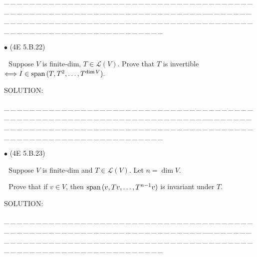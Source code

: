 \documentclass[a4paper, 11pt, UTF8]{article}
\def\Spn{\textup{span}\,}
\def\Lm{\mathcal{L}}
\begin{document}
\begin{large}
\par
{\tiny \_\,\_\,\_\,\_\,\_\,\_\,\_\,\_\,\_\,\_\,\_\,\_\,\_\,\_\,\_\,\_\,\_\,\_\,\_\,\_\,\_\,\_\,\_\,\_\,\_\,\_\,\_\,\_\,\_\,\_\,\_\,\_\,\_\,\_\,\_\,\_\,\_\,\_\,\_\,\_\,\_\,\_\,\_\,\_\,\_\,\_\,\_\,\_\,\_\,\_\,\_\,\_\,\_\,\_\,\_\,\_\,\_\,\_\,\_\,\_\,\_\,\_\,\_\,\_\,\_\,\_\,\_\,\_\,\_\,\_\,\_\_\,\_\,\_\,\_\,\_\,\_\,\_\,\_\,\_\,\_\,\_\,\_\,\_\,\_\,\_\,\_\,\_\,\_\,\_\,\_\,\_\,\_\,\_\,\_\,\_\,\_\,\_\,\_\,\_\,\_\,\_\,\_\,\_\,\_\,\_\,\_\,\_\,\_\,\_\,\_\,\_\,\_\,\_\,\_\,\_\,\_\,\_\,\_\,\_\,\_\,\_\,\_\,\_\,\_\,\_\,\_\,\_\,\_\,\_\,\_\,\_\,\_\,\_\,\_\,\_\,\_\,\_\,\_\,\_\,\_\,\_}\par

{\small $\bullet$} (\normalsize{4E 5.B.22})\par\,\, {\timessl\Large 
Suppose $V$ is finite-dim, $T\in \Lm(V)$. Prove that $T$ is invertible $\Longleftrightarrow I\in\Spn(T, T^2, \dots , T^{\dim V}).$
}\par
{\timesbf S\footnotesize{OLUTION:}}\par\quad

\par
{\tiny \_\,\_\,\_\,\_\,\_\,\_\,\_\,\_\,\_\,\_\,\_\,\_\,\_\,\_\,\_\,\_\,\_\,\_\,\_\,\_\,\_\,\_\,\_\,\_\,\_\,\_\,\_\,\_\,\_\,\_\,\_\,\_\,\_\,\_\,\_\,\_\,\_\,\_\,\_\,\_\,\_\,\_\,\_\,\_\,\_\,\_\,\_\,\_\,\_\,\_\,\_\,\_\,\_\,\_\,\_\,\_\,\_\,\_\,\_\,\_\,\_\,\_\,\_\,\_\,\_\,\_\,\_\,\_\,\_\,\_\,\_\_\,\_\,\_\,\_\,\_\,\_\,\_\,\_\,\_\,\_\,\_\,\_\,\_\,\_\,\_\,\_\,\_\,\_\,\_\,\_\,\_\,\_\,\_\,\_\,\_\,\_\,\_\,\_\,\_\,\_\,\_\,\_\,\_\,\_\,\_\,\_\,\_\,\_\,\_\,\_\,\_\,\_\,\_\,\_\,\_\,\_\,\_\,\_\,\_\,\_\,\_\,\_\,\_\,\_\,\_\,\_\,\_\,\_\,\_\,\_\,\_\,\_\,\_\,\_\,\_\,\_\,\_\,\_\,\_\,\_\,\_}\par

{\small $\bullet$} (\normalsize{4E 5.B.23})\par\,\, {\timessl\Large 
Suppose $V$ is finite-dim and $T\in \Lm(V)$. Let $n = \dim V$.}\par\,\,
{\timessl\Large Prove that if $v \in V$, then $\Spn(v, Tv, \dots , T^{n-1} v)$ is invariant under $T$.
}\par
{\timesbf S\footnotesize{OLUTION:}}\par\quad

\par
{\tiny \_\,\_\,\_\,\_\,\_\,\_\,\_\,\_\,\_\,\_\,\_\,\_\,\_\,\_\,\_\,\_\,\_\,\_\,\_\,\_\,\_\,\_\,\_\,\_\,\_\,\_\,\_\,\_\,\_\,\_\,\_\,\_\,\_\,\_\,\_\,\_\,\_\,\_\,\_\,\_\,\_\,\_\,\_\,\_\,\_\,\_\,\_\,\_\,\_\,\_\,\_\,\_\,\_\,\_\,\_\,\_\,\_\,\_\,\_\,\_\,\_\,\_\,\_\,\_\,\_\,\_\,\_\,\_\,\_\,\_\,\_\_\,\_\,\_\,\_\,\_\,\_\,\_\,\_\,\_\,\_\,\_\,\_\,\_\,\_\,\_\,\_\,\_\,\_\,\_\,\_\,\_\,\_\,\_\,\_\,\_\,\_\,\_\,\_\,\_\,\_\,\_\,\_\,\_\,\_\,\_\,\_\,\_\,\_\,\_\,\_\,\_\,\_\,\_\,\_\,\_\,\_\,\_\,\_\,\_\,\_\,\_\,\_\,\_\,\_\,\_\,\_\,\_\,\_\,\_\,\_\,\_\,\_\,\_\,\_\,\_\,\_\,\_\,\_\,\_\,\_\,\_}\par


\end{large}
\end{document}
